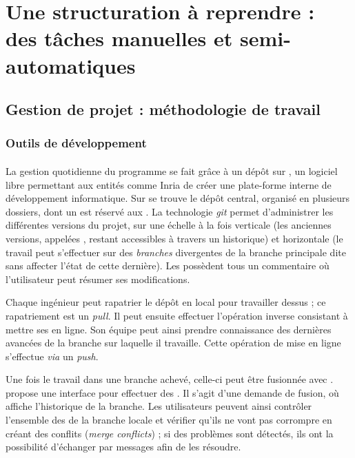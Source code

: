 \part{Une structuration à reprendre : des tâches manuelles et semi-automatiques}

\clearpage
\thispagestyle{empty}
\cleardoublepage

\chapter{Gestion de projet : méthodologie de travail}


\section{Outils de développement}

\subsection{\gitlab}

La gestion quotidienne du programme \timeus{} se fait grâce à un dépôt sur \gitlab{}, un logiciel libre permettant aux entités comme Inria de créer une plate-forme interne de développement informatique. Sur \gitlab{} se trouve le dépôt central, organisé en plusieurs dossiers, dont un est réservé aux \odm. La technologie \textit{git} permet d'administrer les différentes versions du projet, sur une échelle à la fois verticale (les anciennes versions, appelées \commits, restant accessibles à travers un historique) et horizontale (le travail peut s'effectuer sur des \textit{branches} divergentes de la branche principale dite \master{} sans affecter l'état de cette dernière). Les \commits possèdent tous un commentaire où l'utilisateur peut résumer ses modifications.

Chaque ingénieur peut rapatrier le dépôt \gitlab{} en local pour travailler dessus ; ce rapatriement est un \textit{pull}. Il peut ensuite effectuer l'opération inverse consistant à mettre ses \commits{} en ligne. Son équipe peut ainsi prendre connaissance des dernières avancées de la branche sur laquelle il travaille. Cette opération de mise en ligne s'effectue \textit{via} un \textit{push}.

Une fois le travail dans une branche achevé, celle-ci peut être fusionnée avec \master. \gitlab{} propose une interface pour effectuer des \mergerequests{}. Il s'agit d'une demande de fusion, où \gitlab{} affiche l'historique de la branche. Les utilisateurs peuvent ainsi contrôler l'ensemble des \commits{} de la branche locale et vérifier qu'ils ne vont pas corrompre \master{} en créant des conflits (\textit{merge conflicts}) ; si des problèmes sont détectés, ils ont la possibilité d'échanger par messages afin de les résoudre.


